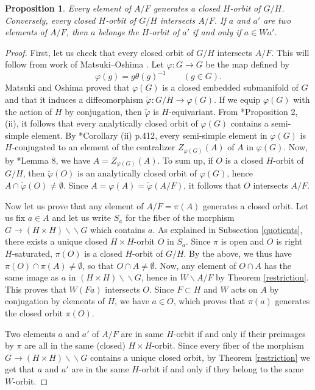 \documentclass{amsart}
\newtheorem{proposition}[theorem]{Proposition}
\theoremstyle{definition}
\newcommand{\dquo}{\backslash \!\! \backslash}
\begin{document}
\begin{proposition}
Every element of $A/F$ generates a closed $H$-orbit of $G/H$. Conversely, every closed $H$-orbit of $G/H$ intersects $A/F$. If $a$ and $a'$ are two elements of $A/F$, then $a$ belongs the $H$-orbit of $a'$ if and only if $a \in W a'$.
\end{proposition}
\begin{proof}
    
    First, let us check that every closed orbit of $G/H$ intersects $A/F$. This will follow from work of Matsuki--Oshima \cite{MatsukiOshima}. Let $\varphi: G \to G$ be the map defined by
    $$\varphi(g) = g \theta(g)^{-1} \qquad (g \in G).$$
    Matsuki and Oshima proved that $\varphi(G)$ is a closed embedded submanifold of $G$ and that it induces a diffeomorphism $\tilde \varphi : G/H \to \varphi(G)$. If we equip $\varphi(G)$ with the action of $H$ by conjugation, then $\tilde \varphi$ is $H$-equivariant. From \cite{MatsukiOshima}*{Proposition 2, (ii)}, it follows that every analytically closed orbit of $\varphi(G)$ contains a semi-simple element. By \cite{MatsukiOshima}*{Corollary (ii) p.412}, every semi-simple element in $\varphi(G)$ is $H$-conjugated to an element of the centralizer $Z_{\varphi(G)}(A)$ of $A$ in $\varphi(G)$. Now, by \cite{MatsukiOshima}*{Lemma 8}, we have $A = Z_{\varphi(G)}(A)$. To sum up, if $O$ is a closed $H$-orbit of $G/H$, then $\tilde \varphi(O)$ is an analytically closed orbit of $\varphi(G)$, hence $A \cap \tilde \varphi(O) \neq \emptyset$. Since $A = \varphi(A) = \tilde\varphi(A/F)$, it follows that $O$ intersects $A/F$.
    
    Now let us prove that any element of $A/F = \pi(A)$ generates a closed orbit. Let us fix $a \in A$ and let us write $S_a$ for the fiber of the morphism $G \to (H\times H) \dquo G$ which contains $a$. As explained in Subsection \ref{quotients}, there exists a unique closed $H\times H$-orbit $O$ in $S_a$. Since $\pi$ is open and $O$ is right $H$-saturated, $\pi(O)$ is a closed $H$-orbit of $G/H$. By the above, we thus have $\pi(O)\cap \pi(A) \neq \emptyset$, so that $O \cap A \neq \emptyset$. Now, any element of $O\cap A$ has the same image as $a$ in $(H\times H) \dquo G$, hence in $W\backslash A /F$ by Theorem \ref{restriction}. This proves that $W(Fa)$ intersects $O$. Since $F \subset H$ and $W$ acts on $A$ by conjugation by elements of $H$, we have $a \in O$, which proves that $\pi(a)$ generates the closed orbit $\pi(O)$.
    
    Two elements $a$ and $a'$ of $A/F$ are in same $H$-orbit if and only if their preimages by $\pi$ are all in the same (closed) $H\times H$-orbit. Since every fiber of the morphism $G \to (H\times H)\dquo G$ contains a unique closed orbit, by Theorem \ref{restriction} we get that $a$ and $a'$ are in the same $H$-orbit if and only if they belong to the same $W$-orbit.
\end{proof}
\end{document}
